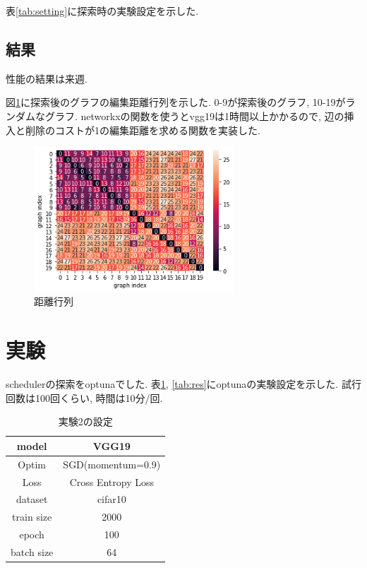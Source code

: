 \documentclass[twocolumn]{jarticle}     %
\begin{document}
表\ref{tab:setting}に探索時の実験設定を示した.

\subsection{結果}

性能の結果は来週.

図\ref{fig:mat}に探索後のグラフの編集距離行列を示した.
0-9が探索後のグラフ, 10-19がランダムなグラフ.
networkxの関数を使うとvgg19は1時間以上かかるので,
辺の挿入と削除のコストが1の編集距離を求める関数を実装した.

\begin{figure}[tb]
	\begin{center}
		\includegraphics[clip,width=75mm]{dist_mat.png}
		\caption{距離行列}
		\label{fig:mat}
	\end{center}
\end{figure}


\section{実験}

schedulerの探索をoptunaでした.
表\ref{tab:setting2}, \ref{tab:res}にoptunaの実験設定を示した.
試行回数は100回くらい, 時間は10分/回.

\begin{table}[tb]
  \begin{center}
    \caption{実験2の設定}
    \begin{tabular}{|c|c|} \hline
      model & VGG19 \\ \hline
      Optim & SGD(momentum=0.9) \\ \hline
      Loss & Cross Entropy Loss \\ \hline
      dataset & cifar10 \\ \hline
      train size & 2000 \\ \hline
      epoch & 100 \\ \hline
      batch size & 64 \\ \hline
    \end{tabular}
    \label{tab:setting2}
  \end{center}
\end{table}
\end{document}
